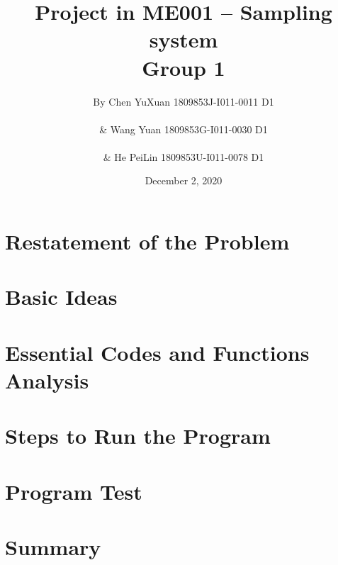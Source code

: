 \documentclass[12pt]{article}
\begin{document}
\title{\textbf{Project in ME001 -- Sampling system\\Group 1}}

\author{By Chen YuXuan 1809853J-I011-0011 D1\\ \\
\& Wang Yuan 1809853G-I011-0030 D1\\ \\
\& He PeiLin 1809853U-I011-0078 D1}

\date{December 2, 2020}
\maketitle

\newpage
\tableofcontents
\newpage

\section{Restatement of the Problem}


\section{Basic Ideas}


\section{Essential Codes and Functions Analysis}


\section{Steps to Run the Program}


\section{Program Test}


\section{Summary}




\newpage
\appendix
\appendixpage
\addappheadtotoc
\end{document}
